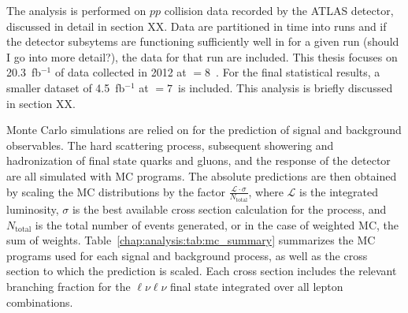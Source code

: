 
The analysis is performed on $pp$ collision data recorded by the ATLAS
detector, discussed in detail in section XX. Data are partitioned in
time into runs and if the detector subsytems are functioning
sufficiently well in for a given run (should I go into more detail?),
the data for that run are included. This thesis focuses on
20.3~fb$^{-1}$ of data collected in 2012 at \sqrts$=8$~\tev. For the
final statistical results, a smaller dataset of
4.5~fb$^{-1}$ at \sqrts$=7$~\tev is included. This analysis is briefly
discussed in section XX. 

Monte Carlo simulations are relied on for the prediction of signal and
background observables. The hard scattering process, subsequent
showering and hadronization of final state quarks and gluons, and the
response of the detector are all simulated with MC programs. The
absolute predictions are then obtained by scaling the MC distributions
by the factor $\frac{\mathcal{L}\cdot{\sigma}}{N_{\mathrm{total}}}$,
where $\mathcal{L}$ is the integrated luminosity, $\sigma$ is the best
available cross section calculation for the process, and
$N_{\mathrm{total}}$ is the total number of events generated, or in
the case of weighted MC, the sum of
weights. Table~\ref{chap:analysis:tab:mc_summary} summarizes the MC
programs used for each signal and background process, as well as the
cross section to which the prediction is scaled. Each cross section
includes the relevant branching fraction for the $\ell\nu\ell\nu$
final state integrated over all lepton combinations. 

